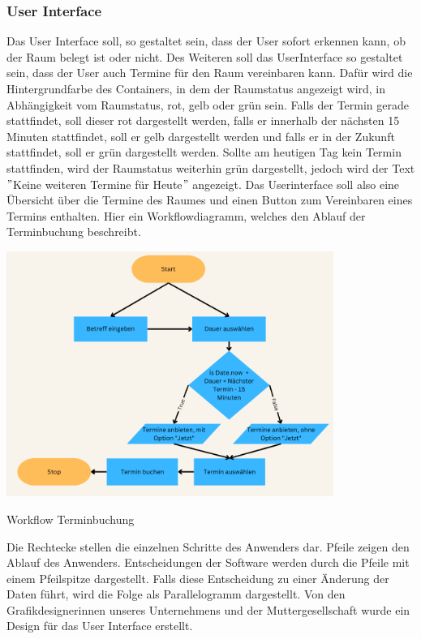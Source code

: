\subsubsection{User Interface}\label{subsec:user-interface}
Das User Interface soll, so gestaltet sein, dass der User sofort erkennen kann, ob der Raum belegt ist oder nicht.
Des Weiteren soll das \gls{UserInterface} so gestaltet sein, dass der User auch Termine für den Raum vereinbaren kann.
Dafür wird die Hintergrundfarbe des Containers, in dem der Raumstatus angezeigt wird, in Abhängigkeit vom Raumstatus, rot, gelb oder grün sein.
Falls der Termin gerade stattfindet, soll dieser rot dargestellt werden, falls er innerhalb der nächsten 15 Minuten stattfindet, soll er gelb dargestellt werden und falls er in der Zukunft stattfindet, soll er grün dargestellt werden.
Sollte am heutigen Tag kein Termin stattfinden, wird der Raumstatus weiterhin grün dargestellt, jedoch wird der Text \("\)Keine weiteren Termine für Heute\("\) angezeigt.
Das Userinterface soll also eine Übersicht über die Termine des Raumes und einen Button zum Vereinbaren eines Termins enthalten.
\newline
Hier ein Workflowdiagramm, welches den Ablauf der Terminbuchung beschreibt.
\par\vspace{1cm}
\centering
\includegraphics[width=0.8\textwidth]{Bilder/Workflow Terminbuchung}
\caption{Workflow Terminbuchung}
\label{fig:Workflow Terminbuchung}
\par\vspace{1cm}
\raggedright
\newline
Die Rechtecke stellen die einzelnen Schritte des Anwenders dar.
Pfeile zeigen den Ablauf des Anwenders.
Entscheidungen der Software werden durch die Pfeile mit einem Pfeilspitze dargestellt.
Falls diese Entscheidung zu einer Änderung der Daten führt, wird die Folge als Parallelogramm dargestellt.
\newline
\newline
Von den Grafikdesignerinnen unseres Unternehmens und der Muttergesellschaft wurde ein Design für das User Interface erstellt.

